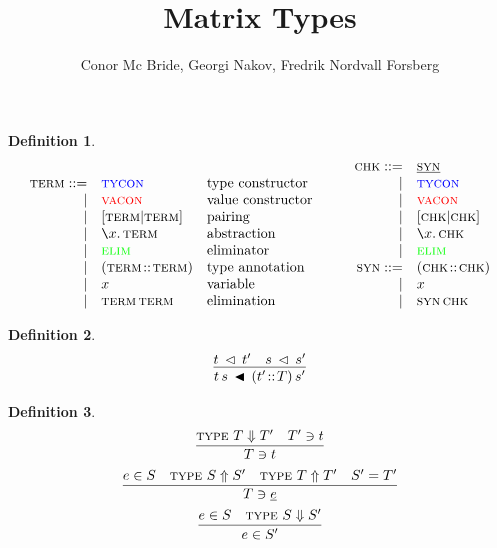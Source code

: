\documentclass[12pt, a4paper]{article}
\title{Matrix Types}
\author{Conor Mc Bride, Georgi Nakov, Fredrik Nordvall Forsberg}{}
\newcommand{\bsl}{\texttt{\symbol{92}}}
\newcommand{\Syn}{\textsc{syn}}
\newcommand{\Chk}{\textsc{chk}}
\newcommand{\TermS}{\textsc{term}}
\newcommand{\TyCon}{\textcolor{blue}{\textsc{tycon}}}
\newcommand{\VaCon}{\textcolor{red}{\textsc{vacon}}}
\newcommand{\Elim}{\textcolor{green}{\textsc{elim}}}
\newcommand{\gp}{\,}
\newcommand{\checkType}[2]{{#1} \ni {#2}}
\newcommand{\synthType}[2]{{#1} \in {#2}}
\newcommand{\rad}[2]{({#1} \!::\! {#2})}
\newcommand{\neu}[1]{\underline{#1}}
\newcommand{\la}[1]{\bsl{#1}.\,}
\newcommand{\chkrel}[2]{{#1} \gp \vartriangleleft \gp {#2}}
\newcommand{\synrel}[2]{{#1} \gp \blacktriangleleft \gp {#2}}
\newcommand{\etaexp}{\Uparrow}
\newcommand{\typexp}[2]{\textsc{type} \gp \gp {#1} \etaexp {#2}}
\newcommand{\steps}{\Downarrow}
\newcommand{\typesteps}[2]{\textsc{type} \gp \gp {#1} \steps {#2}}
\newtheorem{dfn}{Definition}
\begin{document}
\maketitle

\begin{dfn} %

  \[
    \begin{array}{rll}
    \phantom{|}& \\
    \TermS ::= & \TyCon & \mbox{type constructor} \\
    |& \VaCon  & \mbox{value constructor} \\
    |& [ \TermS | \TermS ] & \mbox{pairing} \\
    |& \la{x} \TermS & \mbox{abstraction} \\
    |& \Elim & \mbox{eliminator} \\
    |& \rad{\TermS}{\TermS} & \mbox{type annotation} \\
    |& x & \mbox{variable} \\
    |& \TermS \gp \TermS & \mbox{elimination}
    \end{array}
    \qquad
    \begin{array}{rl}
    \Chk ::=& \neu{\Syn} \\
    |& \TyCon \\
    |& \VaCon \\
    |& [ \Chk | \Chk ] \\
    |& \la{x} \Chk \\
    |& \Elim \\
    \Syn ::=& \rad{\Chk}{\Chk} \\
    |& x \\
    |& \Syn \gp \Chk
    \end{array}
  \]

\end{dfn}

\begin{dfn}
  \[ \infer{\synrel{t \gp s}{\rad{t'}{T} \gp s'}}{\chkrel{t}{t'} & \chkrel{s}{s'}} \]
\end{dfn}

\begin{dfn}
  \begin{gather*}
    \infer{\checkType{T}{t}}{\typesteps{T}{T'} & \checkType{T'}{t}}\\
    \infer{\checkType{T}{\neu{e}}}{\synthType{e}{S} & \typexp{S}{S'} & \typexp{T}{T'} & S' = T'}\\
    \infer{\synthType{e}{S'}}{\synthType{e}{S} & \typesteps{S}{S'}}\\
  \end{gather*}
\end{dfn}
\end{document}
